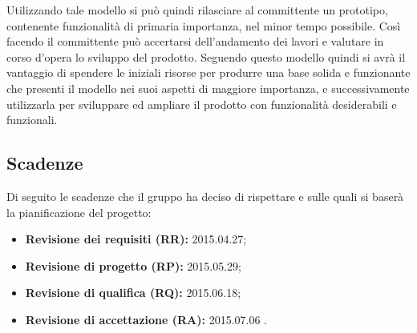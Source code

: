 Utilizzando tale modello si può quindi rilasciare al committente un \gls{prototipo}, contenente funzionalità di primaria importanza, nel minor tempo possibile. Così facendo il committente può accertarsi dell'andamento dei lavori e valutare in corso d'opera lo sviluppo del prodotto. Seguendo questo modello quindi si avrà il vantaggio di spendere le iniziali risorse per produrre una base solida e funzionante che presenti il modello nei suoi aspetti di maggiore importanza, e successivamente utilizzarla per sviluppare ed ampliare il prodotto con funzionalità desiderabili e funzionali.
 
\subsection{Scadenze}
Di seguito le scadenze che il gruppo \GRUPPO{} ha deciso di rispettare e sulle quali si baserà la pianificazione del progetto:
\begin{itemize}
	\item \textbf{Revisione dei requisiti (RR):} 2015.04.27;
	\item \textbf{Revisione di progetto (RP):} 2015.05.29;
	\item \textbf{Revisione di qualifica (RQ):} 2015.06.18;
	\item \textbf{Revisione di accettazione (RA):} 2015.07.06 .
\end{itemize}





